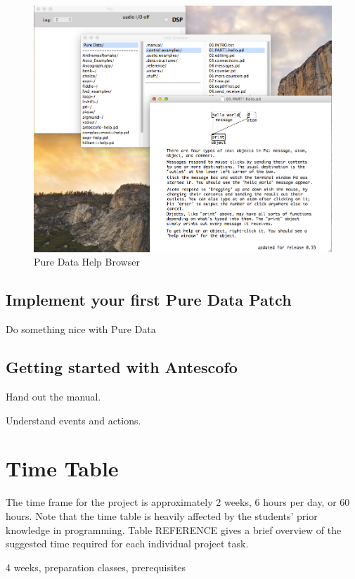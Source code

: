 \documentclass[onecolumn,nocopyrightspace,preprint]{sigplanconf}
\begin{document}
\begin{figure}[ht]
    \centering
    \includegraphics[scale=0.4]{fig/pd-help-browser.png}
    \caption{Pure Data Help Browser}
    \label{fig:pd-help-browser}
\end{figure}

\subsection{Implement your first Pure Data Patch}

Do something nice with Pure Data


\subsection{Getting started with Antescofo}


Hand out the manual.

Understand events and actions.





\section{Time Table}

The time frame for the project is approximately 2 weeks, 6 hours per day, or
60 hours. Note that the time table is heavily affected by the students' prior
knowledge in programming. Table REFERENCE gives a brief overview of the
suggested time required for each individual project task.






4 weeks, preparation classes, prerequisites
\end{document}
